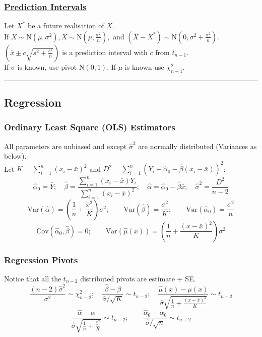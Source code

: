 \documentclass{article}
\begin{document}
\begin{multicols*}{2}
\subsubsection*{\underline{Prediction Intervals}}
Let $X^{*}$ be a future realisation of $X$.\\
If $X \sim \mbox{N}(\mu, \sigma^{2}), \bar{X} \sim \mbox{N}(\mu, \frac{\sigma^{2}}{n}), \mbox{ and } (\bar{X}-X^{*}) \sim \mbox{N}(0, \sigma^{2} + \frac{\sigma^{2}}{n})$.\\
$\left( \bar{x} \pm c \sqrt{s^{2} + \frac{s^{2}}{n}} \right)$ is a prediction interval with $c$ from $t_{n-1}$.\\
If $\sigma$ is known, use pivot $\mbox{N}(0, 1)$. If $\mu$ is known use $\chi^{2}_{n-1}$.

\noindent\rule{\linewidth}{0.25pt}
\subsection*{Regression}
\subsubsection*{Ordinary Least Square (OLS) Estimators}
All parameters are unbiased and except $\hat{\sigma}^{2}$ are normally distributed (Variances as below).\\
Let $K = \sum_{i=1}^{n}(x_{i}-\bar{x})^{2}$ and $D^{2} = \sum_{i=1}^{n}(Y_{i} - \hat{\alpha}_{0} - \hat{\beta}(x_{i} - \bar{x}))^{2}$:
$$\hat{\alpha}_{0} = \bar{Y}; \quad \hat{\beta} = \frac{\sum_{i=1}^{n}(x_{i}-\bar{x})Y_{i}}{\sum_{i=1}^{n}(x_{i}-\bar{x})^{2}}; \quad \hat{\alpha} = \hat{\alpha}_{0} - \hat{\beta}\bar{x}; \quad \hat{\sigma}^{2} = \frac{D^{2}}{n-2}$$
$$\mbox{Var}(\hat{\alpha}) = \left( \frac{1}{n} + \frac{\bar{x}^{2}}{K} \right) \sigma^{2}; \qquad \mbox{Var}(\hat{\beta}) = \frac{\sigma^{2}}{K}; \qquad \mbox{Var}(\hat{\alpha}_{0}) = \frac{\sigma^{2}}{n}$$
$$\mbox{Cov}(\hat{\alpha}_{0}, \hat{\beta}) = 0; \qquad \mbox{Var}(\hat{\mu}(x)) = \left( \frac{1}{n} + \frac{(x-\bar{x})^{2}}{K} \right) \sigma^{2}$$
\subsubsection*{Regression Pivots}
Notice that all the $t_{n-2}$ distributed pivots are estimate $\div$ SE.
$$\frac{(n-2)\hat{\sigma}^{2}}{\sigma^{2}} \sim \chi^{2}_{n-2}; \quad \frac{\hat{\beta} - \beta}{\hat{\sigma} / \sqrt{K}} \sim t_{n-2}; \quad \frac{\hat{\mu}(x) - \mu(x)}{\hat{\sigma} \sqrt{\frac{1}{n} + \frac{(x - \bar{x})^{2}}{K}}} \sim t_{n-2}$$
$$\frac{\hat{\alpha} - \alpha}{\hat{\sigma} \sqrt{\frac{1}{n} + \frac{\bar{x}^{2}}{K}}} \sim t_{n-2}; \qquad \frac{\hat{\alpha}_{0} - \alpha_{0}}{\hat{\sigma} / \sqrt{n}} \sim t_{n-2}$$


\end{multicols*}
\end{document}
